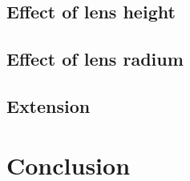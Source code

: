 \subsection{Effect of lens height}


\subsection{Effect of lens radium}

\subsection{Extension}


\section{Conclusion}



